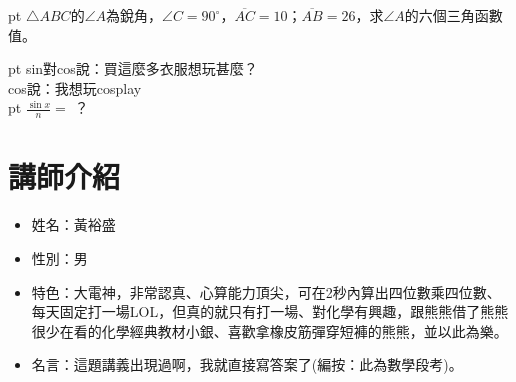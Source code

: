 \noindent
{}  pt
\noindent
$\bigtriangleup ABC$的$\angle A$為銳角，$\angle C=90^\circ$，$\overline{AC}=10$；$\overline{AB}=26$，求$\angle A$的六個三角函數值。
\vspace{5cm}

\noindent
{}  pt
\noindent
sin對cos說：買這麼多衣服想玩甚麼？\\
cos說：我想玩cosplay \\


\noindent
{}  pt
\noindent
$\frac{\sin x}{n} =$ ？ \\

\section{講師介紹}
\begin{itemize}
\item 姓名：黃裕盛
\item 性別：男
\item 特色：大電神，非常認真、心算能力頂尖，可在2秒內算出四位數乘四位數、每天固定打一場LOL，但真的就只有打一場、對化學有興趣，跟熊熊借了熊熊很少在看的化學經典教材小銀、喜歡拿橡皮筋彈穿短褲的熊熊，並以此為樂。
\item 名言：這題講義出現過啊，我就直接寫答案了(編按：此為數學段考)。
\end{itemize}